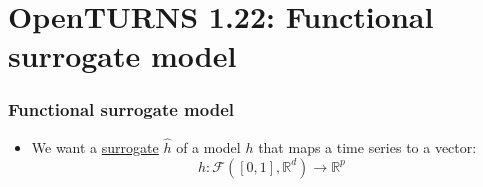 \documentclass{beamer}
\begin{document}
\section{OpenTURNS 1.22: Functional surrogate model}
\usetikzlibrary {arrows.meta} %

\begin{frame}
  \frametitle{Functional surrogate model}
  
  \small
      \begin{itemize}
        \item We want a \href{http://openturns.github.io/openturns/1.22/auto_reliability_sensitivity/reliability_processes/plot_field_fca_sobol.html}{surrogate} $\hat{h}$ of a model $h$ that maps a time series to a vector:
        \begin{equation*}
          h: \mathcal{F}([0, 1], \mathbb{R}^d) \rightarrow \mathbb{R}^p
        \end{equation*}

\end{itemize}
\end{frame}
\end{document}
